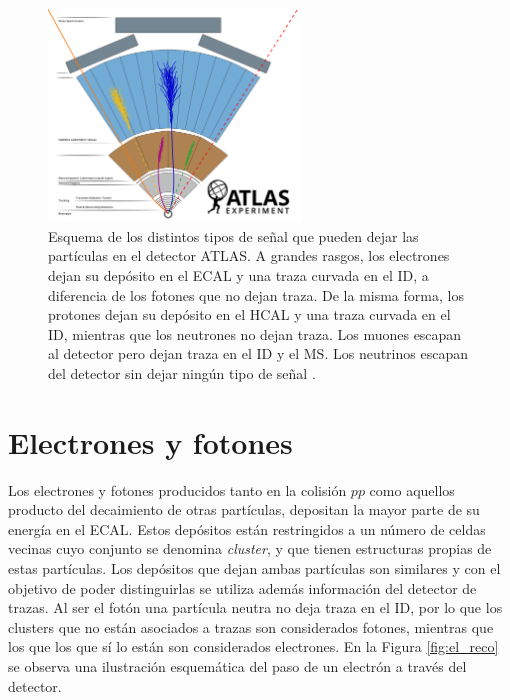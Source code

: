 \begin{figure}
\centering
  \includegraphics[width=0.6\textwidth]{images/objects/det_part_2.pdf}
\caption{Esquema de los distintos tipos de señal que pueden dejar las partículas en el detector ATLAS. A grandes rasgos, los electrones dejan su depósito en el ECAL y una traza curvada en el ID, a diferencia de los fotones que no dejan traza. De la misma forma, los protones dejan su depósito en el HCAL y una traza curvada en el ID, mientras que los neutrones no dejan traza. Los muones escapan al detector pero dejan traza en el ID y el MS. Los neutrinos escapan del detector sin dejar ningún tipo de señal \cite{Mehlhase:2770815}.}
\label{fig:particulasATLAS}
\end{figure}

\section{Electrones y fotones}\label{sec:ph_el}


Los electrones y fotones producidos tanto en la colisión $pp$ como aquellos producto del decaimiento de otras partículas, depositan la mayor parte de su energía en el ECAL. Estos depósitos están restringidos a un número de celdas vecinas cuyo conjunto se denomina \textit{cluster}, y que tienen estructuras propias de estas partículas. Los depósitos que dejan ambas partículas son similares y con el objetivo de poder distinguirlas se utiliza además información del detector de trazas. Al ser el fotón una partícula neutra no deja traza en el ID, por lo que los clusters que no están asociados a trazas son considerados fotones, mientras que los que los que sí lo están son considerados electrones. En la Figura \ref{fig:el_reco} se observa una ilustración esquemática del paso de un electrón a través del detector.

